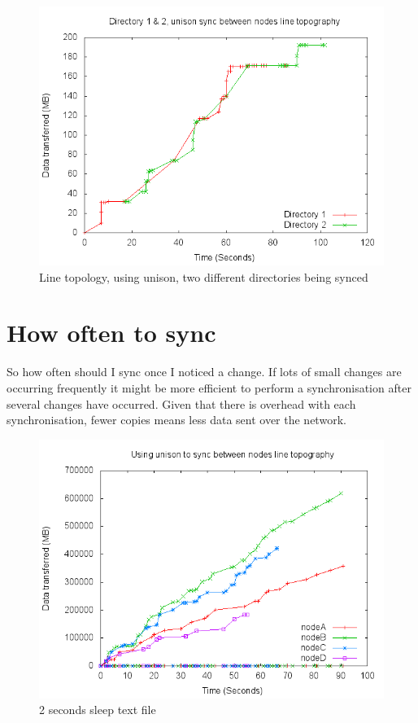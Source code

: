 \documentclass[12pt]{article}
\begin{document}
\begin{figure}[htp]
    \centering
    \includegraphics[scale=0.5]{images/line-uni-2dir-comb.png}
    \caption{Line topology, using unison, two different directories being synced}
    \label{fig:line_uni_2dir_comb_graph}
\end{figure}
\newpage

\section{How often to sync}
So how often should I sync once I noticed a change.
If lots of small changes are occurring frequently it might be more efficient
to perform a synchronisation after several changes have occurred. Given that
there is overhead with each synchronisation, fewer copies means less data
sent over the network.

\begin{figure}[htp]
    \centering
    \includegraphics[scale=0.5]{images/rand-txt-2sleep.png}
    \caption{2 seconds sleep text file}
    \label{fig:2sleep_graph}
\end{figure}
\end{document}
